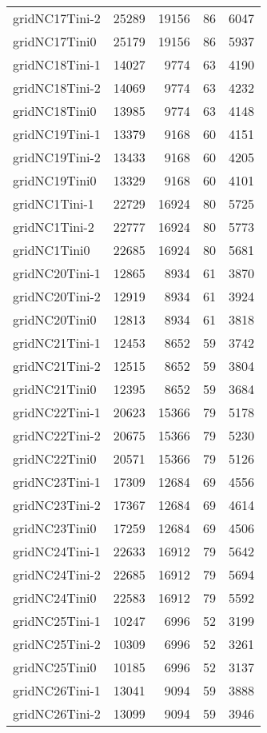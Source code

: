 \begin{tabular}{lrrrr}
gridNC17Tini-2 & 25289 & 19156 & 86 & 6047 \\
gridNC17Tini0 & 25179 & 19156 & 86 & 5937 \\
gridNC18Tini-1 & 14027 & 9774 & 63 & 4190 \\
gridNC18Tini-2 & 14069 & 9774 & 63 & 4232 \\
gridNC18Tini0 & 13985 & 9774 & 63 & 4148 \\
gridNC19Tini-1 & 13379 & 9168 & 60 & 4151 \\
gridNC19Tini-2 & 13433 & 9168 & 60 & 4205 \\
gridNC19Tini0 & 13329 & 9168 & 60 & 4101 \\
gridNC1Tini-1 & 22729 & 16924 & 80 & 5725 \\
gridNC1Tini-2 & 22777 & 16924 & 80 & 5773 \\
gridNC1Tini0 & 22685 & 16924 & 80 & 5681 \\
gridNC20Tini-1 & 12865 & 8934 & 61 & 3870 \\
gridNC20Tini-2 & 12919 & 8934 & 61 & 3924 \\
gridNC20Tini0 & 12813 & 8934 & 61 & 3818 \\
gridNC21Tini-1 & 12453 & 8652 & 59 & 3742 \\
gridNC21Tini-2 & 12515 & 8652 & 59 & 3804 \\
gridNC21Tini0 & 12395 & 8652 & 59 & 3684 \\
gridNC22Tini-1 & 20623 & 15366 & 79 & 5178 \\
gridNC22Tini-2 & 20675 & 15366 & 79 & 5230 \\
gridNC22Tini0 & 20571 & 15366 & 79 & 5126 \\
gridNC23Tini-1 & 17309 & 12684 & 69 & 4556 \\
gridNC23Tini-2 & 17367 & 12684 & 69 & 4614 \\
gridNC23Tini0 & 17259 & 12684 & 69 & 4506 \\
gridNC24Tini-1 & 22633 & 16912 & 79 & 5642 \\
gridNC24Tini-2 & 22685 & 16912 & 79 & 5694 \\
gridNC24Tini0 & 22583 & 16912 & 79 & 5592 \\
gridNC25Tini-1 & 10247 & 6996 & 52 & 3199 \\
gridNC25Tini-2 & 10309 & 6996 & 52 & 3261 \\
gridNC25Tini0 & 10185 & 6996 & 52 & 3137 \\
gridNC26Tini-1 & 13041 & 9094 & 59 & 3888 \\
gridNC26Tini-2 & 13099 & 9094 & 59 & 3946 \\

\end{tabular}
